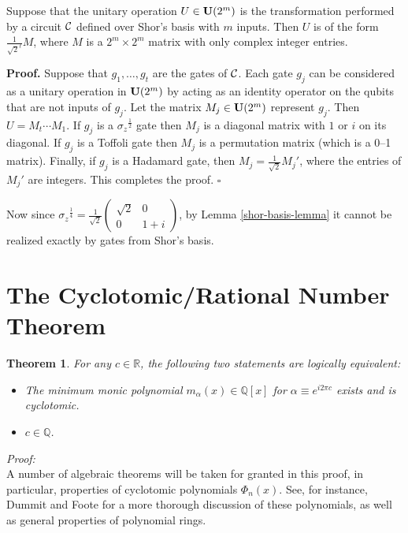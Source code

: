 \documentclass[twocolumn,11pt]{article}
\begin{document}
\begin{lemma}
Suppose that the unitary operation $U\in\mbox{\bf U}(2^m)$ is the transformation
performed by a circuit $\cal C$ defined over  Shor's basis with $m$ inputs. Then $U$ is 
of the form $\frac{1}{\sqrt{2}^\ell}M$, where $M$ is a $2^m\times 2^m$
matrix with only complex integer entries.
\label{shor-basis-lemma}
\end{lemma}

{\bf Proof.} Suppose that $g_1,\ldots,g_t$ are the gates of $\cal C$.
Each gate $g_j$ can be considered as a unitary operation in 
$\mbox{\bf U}(2^m)$ by acting as an identity operator on the qubits that are not inputs
of $g_j$. Let the matrix $M_j\in\mbox{\bf U}(2^m)$ represent $g_j$. Then
$U=M_t\cdots M_1$. If $g_j$ is a ${\sigma_z}^{\frac{1}{2}}$ gate then $M_j$ is
a diagonal matrix with $1$ or $i$ on its diagonal. If $g_j$ is a Toffoli gate
then $M_j$ is a permutation matrix (which is a 0--1 matrix). Finally, if $g_j$ is a
Hadamard gate, then $M_j=\frac{1}{\sqrt{2}}{M_j}'$, where the entries of
${M_j}'$ are integers.
This completes the proof. $\square$


Now since 
${\sigma_z}^{\frac{1}{4}}=\frac{1}{\sqrt{2}}\begin{pmatrix}
   \sqrt{2} & 0 \\ 0 & 1+i \end{pmatrix}$, by Lemma \ref{shor-basis-lemma}
it cannot be realized exactly by gates from Shor's basis.
         






\newtheorem{theorem}{Theorem}[section]

\section{The Cyclotomic/Rational Number Theorem}\label{cycloappendix}
\begin{theorem}\label{cyclotheorem}
For any $c\in\mathbb R$, the following two statements are logically
equivalent:

\begin{itemize}
\item The minimum monic polynomial $m_\alpha(x)\in\mathbb Q[x]$ for
$\alpha\equiv e^{i2\pi c}$ exists and is cyclotomic.
\item $c\in\mathbb Q$.
\end{itemize}

\end{theorem}
{\it Proof:}\\
A number of algebraic theorems will be taken for granted in this proof,
in particular, properties of cyclotomic polynomials $\Phi_n(x)$.  See,
for instance, Dummit and Foote\cite{aa} for a more thorough discussion
of these polynomials, as well as general properties of polynomial rings.
\end{document}
